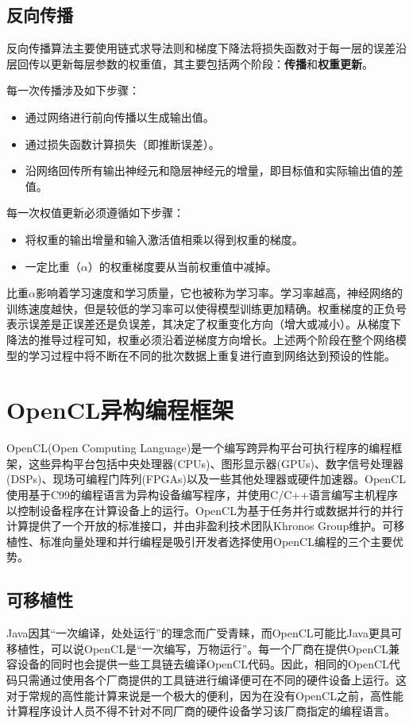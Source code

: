\subsection{反向传播}

反向传播算法主要使用链式求导法则和梯度下降法将损失函数对于每一层的误差沿层回传以更新每层参数的权重值，其主要包括两个阶段：\textbf{传播}和\textbf{权重更新}。

每一次传播涉及如下步骤：

\begin{itemize}
  \item 通过网络进行前向传播以生成输出值。
  \item 通过损失函数计算损失（即推断误差）。
  \item 沿网络回传所有输出神经元和隐层神经元的增量，即目标值和实际输出值的差值。
\end{itemize}

每一次权值更新必须遵循如下步骤：

\begin{itemize}
  \item 将权重的输出增量和输入激活值相乘以得到权重的梯度。
  \item 一定比重（$\alpha$）的权重梯度要从当前权重值中减掉。
\end{itemize}


比重$\alpha$影响着学习速度和学习质量，它也被称为学习率。学习率越高，神经网络的训练速度越快，但是较低的学习率可以使得模型训练更加精确。权重梯度的正负号表示误差是正误差还是负误差，其决定了权重变化方向（增大或减小）。从梯度下降法的推导过程可知，权重必须沿着逆梯度方向增长。上述两个阶段在整个网络模型的学习过程中将不断在不同的批次数据上重复进行直到网络达到预设的性能。

\section{OpenCL异构编程框架}

OpenCL(Open Computing Language)是一个编写跨异构平台可执行程序的编程框架，这些异构平台包括中央处理器(CPUs)、图形显示器(GPUs)、数字信号处理器(DSPs)、现场可编程门阵列(FPGAs)以及一些其他处理器或硬件加速器。OpenCL使用基于C99的编程语言为异构设备编写程序，并使用C/C++语言编写主机程序以控制设备程序在计算设备上的运行。OpenCL为基于任务并行或数据并行的并行计算提供了一个开放的标准接口，并由非盈利技术团队Khronos Group维护。可移植性、标准向量处理和并行编程是吸引开发者选择使用OpenCL编程的三个主要优势。

\subsection{可移植性}
Java因其“一次编译，处处运行”的理念而广受青睐，而OpenCL可能比Java更具可移植性，可以说OpenCL是“一次编写，万物运行”。每一个厂商在提供OpenCL兼容设备的同时也会提供一些工具链去编译OpenCL代码。因此，相同的OpenCL代码只需通过使用各个厂商提供的工具链进行编译便可在不同的硬件设备上运行。这对于常规的高性能计算来说是一个极大的便利，因为在没有OpenCL之前，高性能计算程序设计人员不得不针对不同厂商的硬件设备学习该厂商指定的编程语言。

